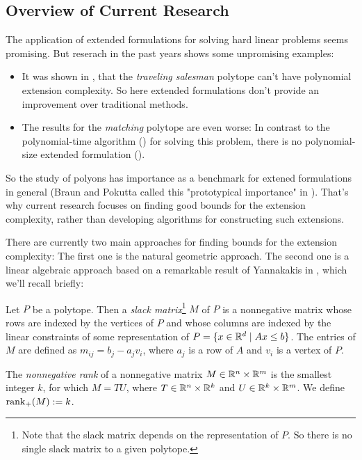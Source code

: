 \subsection{Overview of Current Research}

The application of extended formulations for solving hard linear problems seems promising. But reserach in the past years shows some unpromising examples:
\begin{itemize}
  \item It was shown in \cite{fiorini2015exponential}, that the \emph{traveling salesman} polytope can't have polynomial extension complexity. So here extended formulations don't provide an improvement over traditional methods.
  \item The results for the \emph{matching} polytope are even worse: In contrast to the polynomial-time algorithm (\cite{ford1956maximal}) for solving this problem, there is no polynomial-size extended formulation (\cite{rothvoss2017matching}).
\end{itemize}

So the study of polyons has importance as a benchmark for extened formulations in general (Braun and Pokutta called this "prototypical importance" in \cite{braun2015matching}).
That's why current research focuses on finding good bounds for the extension complexity, rather than developing algorithms for constructing such extensions.

There are currently two main approaches for finding bounds for the extension complexity: The first one is the natural geometric approach. The second one is a linear algebraic approach based on a remarkable result of Yannakakis in \cite{yannakakis1991expressing}, which we'll recall briefly:

\begin{definition}
  Let $P$ be a polytope.
  Then a \emph{slack matrix}\footnote{Note that the slack matrix depends on the representation of $P$. So there is no single slack matrix to a given polytope.} $M$ of $P$ is a nonnegative matrix whose rows are indexed by the vertices of $P$ and whose columns are indexed by the linear constraints of some representation of $P=\{x \in \mathbb{R}^d \mid Ax \leq b\}$. 
  The entries of $M$ are defined as $m_{ij} = b_j - a_j v_i$, where $a_j$ is a row of $A$ and $v_i$ is a vertex of $P$.
\end{definition}

\begin{definition}
  The \emph{nonnegative rank} of a nonnegative matrix $M \in \mathbb{R}^n \times \mathbb{R}^m$ is the smallest integer $k$, for which $M = TU$, where $T \in \mathbb{R}^n \times \mathbb{R}^k$ and $U \in \mathbb{R}^k \times \mathbb{R}^m$.
  We define $\operatorname{rank}_+(M) := k$.
\end{definition}

